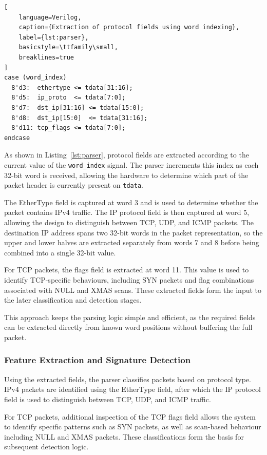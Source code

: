 \begin{lstlisting}[
    language=Verilog,
    caption={Extraction of protocol fields using word indexing},
    label={lst:parser},
    basicstyle=\ttfamily\small,
    breaklines=true
]
case (word_index)
  8'd3:  ethertype <= tdata[31:16];
  8'd5:  ip_proto  <= tdata[7:0];
  8'd7:  dst_ip[31:16] <= tdata[15:0];
  8'd8:  dst_ip[15:0]  <= tdata[31:16];
  8'd11: tcp_flags <= tdata[7:0];
endcase
\end{lstlisting}

As shown in Listing~\ref{lst:parser}, protocol fields are extracted according
to the current value of the \texttt{word\_index} signal. The parser increments
this index as each 32-bit word is received, allowing the hardware to determine
which part of the packet header is currently present on \texttt{tdata}.

The EtherType field is captured at word 3 and is used to determine whether the
packet contains IPv4 traffic. The IP protocol field is then captured at word 5,
allowing the design to distinguish between TCP, UDP, and ICMP packets. The
destination IP address spans two 32-bit words in the packet representation, so
the upper and lower halves are extracted separately from words 7 and 8 before
being combined into a single 32-bit value.

For TCP packets, the flags field is extracted at word 11. This value is used to
identify TCP-specific behaviours, including SYN packets and flag combinations
associated with NULL and XMAS scans. These extracted fields form the input to
the later classification and detection stages.

This approach keeps the parsing logic simple and efficient, as the required
fields can be extracted directly from known word positions without buffering
the full packet.




\subsubsection{Feature Extraction and Signature Detection}
Using the extracted fields, the parser classifies packets based on protocol
type. IPv4 packets are identified using the EtherType field, after which the IP
protocol field is used to distinguish between TCP, UDP, and ICMP traffic.

For TCP packets, additional inspection of the TCP flags field allows the system
to identify specific patterns such as SYN packets, as well as scan-based
behaviour including NULL and XMAS packets. These classifications form the basis
for subsequent detection logic.

